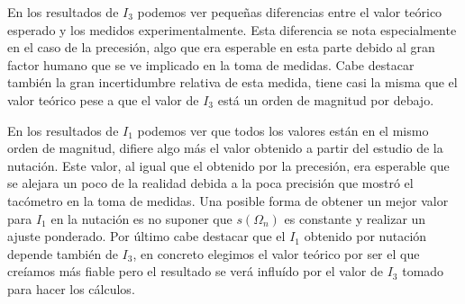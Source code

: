 \documentclass[a4paper,12pt,titlepage]{article}
\begin{document}
En los resultados de $I_3$ podemos ver pequeñas diferencias entre el valor teórico esperado y los medidos experimentalmente. Esta diferencia se nota especialmente en el caso de la precesión, algo que era esperable en esta parte debido al gran factor humano que se ve implicado en la toma de medidas. Cabe destacar también la gran incertidumbre relativa de esta medida, tiene casi la misma que el valor teórico pese a que el valor de $I_3$ está un orden de magnitud por debajo. 
\par En los resultados de $I_1$ podemos ver que todos los valores están en el mismo orden de magnitud, difiere algo más el valor obtenido a partir del estudio de la nutación. Este valor, al igual que el obtenido por la precesión, era esperable que se alejara un poco de la realidad debida a la poca precisión que mostró el tacómetro en la toma de medidas. Una posible forma de obtener un mejor valor para $I_1$ en la nutación es no suponer que $s(\Omega_n)$ es constante y realizar un ajuste ponderado. Por último cabe destacar que el $I_1$ obtenido por nutación depende también de $I_3$, en concreto elegimos el valor teórico por ser el que creíamos más fiable pero el resultado se verá influído por el valor de $I_3$ tomado para hacer los cálculos.
\end{document}
